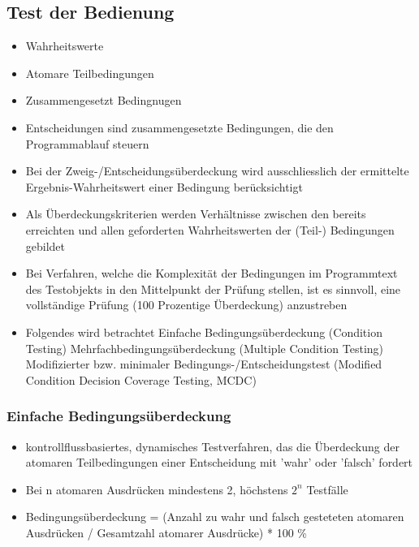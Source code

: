 \documentclass{report}
\theoremstyle{definition}
\theoremstyle{example}
\begin{document}
\subsection{Test der Bedienung}
\begin{itemize}
   \item Wahrheitswerte
   \item Atomare Teilbedingungen
   \item Zusammengesetzt Bedingnugen
   \item Entscheidungen sind zusammengesetzte Bedingungen, die den Programmablauf steuern
   \item Bei der Zweig-/Entscheidungsüberdeckung wird ausschliesslich der ermittelte Ergebnis-Wahrheitswert einer Bedingung berücksichtigt
   \item Als Überdeckungskriterien werden Verhältnisse zwischen den bereits erreichten und allen geforderten Wahrheitswerten der (Teil-) Bedingungen gebildet
   \item Bei Verfahren, welche die Komplexität der Bedingungen im Programmtext des Testobjekts in den Mittelpunkt der Prüfung stellen, ist es sinnvoll, eine vollständige Prüfung (100 Prozentige Überdeckung) anzustreben
   \item Folgendes wird betrachtet
   \subitem Einfache Bedingungsüberdeckung (Condition Testing)
   \subitem Mehrfachbedingungsüberdeckung (Multiple Condition Testing)
   \subitem Modifizierter bzw. minimaler Bedingungs-/Entscheidungstest (Modified Condition Decision Coverage Testing, MCDC)
\end{itemize}

\subsubsection{Einfache Bedingungsüberdeckung}
\begin{itemize}
   \item kontrollflussbasiertes, dynamisches Testverfahren, das die Überdeckung der atomaren Teilbedingungen einer Entscheidung mit 'wahr' oder 'falsch' fordert
   \item Bei n atomaren Ausdrücken mindestens 2, höchstens $2^n$ Testfälle
   \item Bedingungsüberdeckung = (Anzahl zu wahr und falsch gesteteten atomaren Ausdrücken / Gesamtzahl atomarer Ausdrücke) * 100 \%
\end{itemize}
\end{document}
